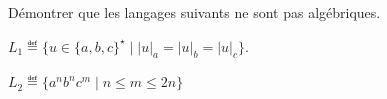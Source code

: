 
\begingroup

\begin{exercice}\label{exo:parsing/expressiveness/pumping}

  Démontrer que les langages suivants ne sont pas algébriques.
  \begin{questions}
  \item $L_1 \eqdef \{ u \in \{a, b, c\}^\star \mid |u|_a = |u|_b = |u|_c \}$.
  \item $L_2 \eqdef \{a^n b^n c^m \mid n \leq m \leq 2n\}$
  \end{questions}

\end{exercice}

\begin{corrections}


\end{corrections}
